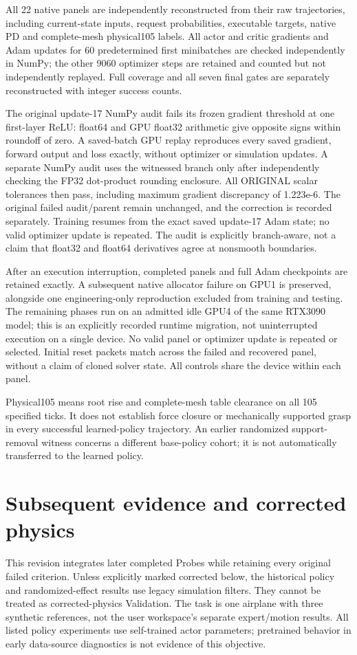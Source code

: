 \documentclass[10pt]{article}
\begin{document}
All 22 native panels are independently reconstructed from their raw
trajectories, including current-state inputs, request probabilities, executable
targets, native PD and complete-mesh physical105 labels. All actor and critic
gradients and Adam updates for 60 predetermined first minibatches are checked
independently in NumPy; the other 9060 optimizer steps are retained and counted
but not independently replayed. Full coverage and all seven final gates are
separately reconstructed with integer success counts.

The original update-17 NumPy audit fails its frozen gradient threshold at one
first-layer ReLU: float64 and GPU float32 arithmetic give opposite signs within
roundoff of zero. A saved-batch GPU replay reproduces every saved gradient,
forward output and loss exactly, without optimizer or simulation updates. A
separate NumPy audit uses the witnessed branch only after independently checking
the FP32 dot-product rounding enclosure. All ORIGINAL scalar tolerances then
pass, including maximum gradient discrepancy of 1.223e-6. The original failed
audit/parent remain unchanged, and the correction is recorded separately.
Training resumes from the exact saved update-17 Adam state; no valid optimizer
update is repeated. The audit is explicitly branch-aware, not a claim that
float32 and float64 derivatives agree at nonsmooth boundaries.

After an execution interruption, completed panels and full Adam checkpoints are
retained exactly. A subsequent native allocator failure on GPU1 is preserved,
alongside one engineering-only reproduction excluded from training and testing.
The remaining phases run on an admitted idle GPU4 of the same RTX3090 model;
this is an explicitly recorded runtime migration, not uninterrupted execution
on a single device. No valid panel or optimizer update is repeated or selected.
Initial reset packets match across the failed and recovered panel, without a
claim of cloned solver state. All controls share the device within each panel.

Physical105 means root rise and complete-mesh table clearance on all 105
specified ticks. It does not establish force closure or mechanically supported
grasp in every successful learned-policy trajectory. An earlier randomized
support-removal witness concerns a different base-policy cohort; it is not
automatically transferred to the learned policy.


\clearpage
\section{Subsequent evidence and corrected physics}
This revision integrates later completed Probes while retaining every original
failed criterion. Unless explicitly marked corrected below, the historical
policy and randomized-effect results use legacy simulation filters. They cannot
be treated as corrected-physics Validation. The task is one airplane with three
synthetic references, not the user workspace's separate expert/motion results.
All listed policy experiments use self-trained actor parameters; pretrained
behavior in early data-source diagnostics is not evidence of this objective.
\end{document}
